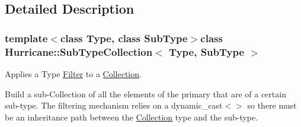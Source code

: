 \subsection{Detailed Description}
\subsubsection*{template$<$class Type, class Sub\-Type$>$class Hurricane\-::\-Sub\-Type\-Collection$<$ Type, Sub\-Type $>$}

Applies a Type \hyperlink{classHurricane_1_1Filter}{Filter} to a \hyperlink{classHurricane_1_1Collection}{Collection}. 

Build a sub-\/\-Collection of all the elements of the primary that are of a certain sub-\/type. The filtering mechanism relies on a {\ttfamily dynamic\-\_\-cast$<$$>$} so there must be an inheritance path between the \hyperlink{classHurricane_1_1Collection}{Collection} type and the sub-\/type. 

